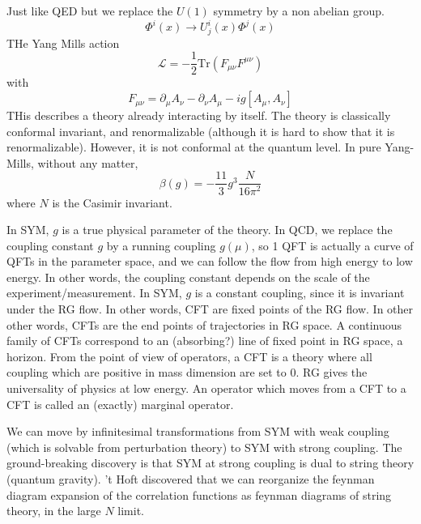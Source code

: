 \documentclass[a4paper]{book}
\theoremstyle{definition}
\theoremstyle{remark}
\begin{document}
Just like QED but we replace the $U(1)$ symmetry by a non abelian group. 
\begin{equation}
        \Phi^i (x) \rightarrow U^i_j (x) \Phi^j(x)
\end{equation}
THe Yang Mills action 
\begin{equation}
    \mathcal L = -\frac{1}{2}\text{Tr}(F_{\mu\nu}F^{\mu\nu})
\end{equation}
with
\begin{equation}
    F_{\mu\nu} = \partial_\mu A_\nu - \partial_\nu A_\mu - ig [A_\mu, A_\nu ]
\end{equation}
THis describes a theory already interacting by itself. The theory is classically conformal invariant, and renormalizable (although it is hard to show that it is renormalizable). However, it is not conformal at the quantum level. In pure Yang-Mills, without any matter, 
\begin{equation}
    \beta (g) = -\frac{11}{3}g^3 \frac{N}{16\pi^2}
\end{equation}
where $N$ is the Casimir invariant. \par \medskip 

In SYM, $g$ is a true physical parameter of the theory. In QCD, we replace the coupling constant $g$ by a running coupling $g(\mu)$, so 1 QFT is actually a curve of QFTs in the parameter space, and we can follow the flow from high energy to low energy. In other words, the coupling constant depends on the scale of the experiment/measurement. In SYM, $g$ is a constant coupling, since it is invariant under the RG flow. In other words, CFT are fixed points of the RG flow. In other other words, CFTs are the end points of trajectories in RG space. A continuous family of CFTs correspond to an (absorbing?) line of fixed point in RG space, a horizon. From the point of view of operators, a CFT is a theory where all coupling which are positive in mass dimension are set to 0. RG gives the universality of physics at low energy. An operator which moves from a CFT to a CFT is called an (exactly) marginal operator. \par \medskip 

We can move by infinitesimal transformations from SYM with weak coupling (which is solvable from perturbation theory) to SYM with strong coupling. The ground-breaking discovery is that SYM at strong coupling is dual to string theory (quantum gravity). 't Hoft discovered that we can reorganize the feynman diagram expansion of the correlation functions as feynman diagrams of string theory, in the large $N$ limit. 
\end{document}
